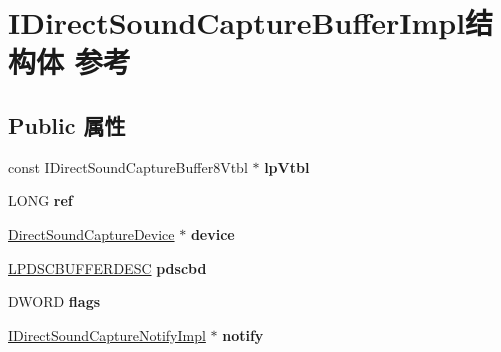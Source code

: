 \hypertarget{struct_i_direct_sound_capture_buffer_impl}{}\section{I\+Direct\+Sound\+Capture\+Buffer\+Impl结构体 参考}
\label{struct_i_direct_sound_capture_buffer_impl}
\subsection*{Public 属性}
\begin{DoxyCompactItemize}
\item 
\mbox{\label{struct_i_direct_sound_capture_buffer_impl_a65ac0c68d4c5d3e6f919ec9c954d5baa}} 
const I\+Direct\+Sound\+Capture\+Buffer8\+Vtbl $\ast$ {\bfseries lp\+Vtbl}
\item 
\mbox{\label{struct_i_direct_sound_capture_buffer_impl_ab243cdfa3d155a57086acc28021a57c0}} 
L\+O\+NG {\bfseries ref}
\item 
\mbox{\label{struct_i_direct_sound_capture_buffer_impl_a07038d79d72cd0a3f93b3c1dac0aff1d}} 
\hyperlink{struct_direct_sound_capture_device}{Direct\+Sound\+Capture\+Device} $\ast$ {\bfseries device}
\item 
\mbox{\label{struct_i_direct_sound_capture_buffer_impl_a534e3d75a21ae7aafad69db2e7ebab8d}} 
\hyperlink{struct___d_s_c_b_u_f_f_e_r_d_e_s_c}{L\+P\+D\+S\+C\+B\+U\+F\+F\+E\+R\+D\+E\+SC} {\bfseries pdscbd}
\item 
\mbox{\label{struct_i_direct_sound_capture_buffer_impl_a5e95182314051e87d51088bbea39be15}} 
D\+W\+O\+RD {\bfseries flags}
\item 
\mbox{\label{struct_i_direct_sound_capture_buffer_impl_a0c3e9c4af6c65b17ebf41b45d66bb0b8}} 
\hyperlink{struct_i_direct_sound_capture_notify_impl}{I\+Direct\+Sound\+Capture\+Notify\+Impl} $\ast$ {\bfseries notify}
\item 
\mbox{\label{struct_i_direct_sound_capture_buffer_impl_a43707a2b7b5aa166d8ab94475baf03ea}} 

\end{DoxyCompactItemize}
